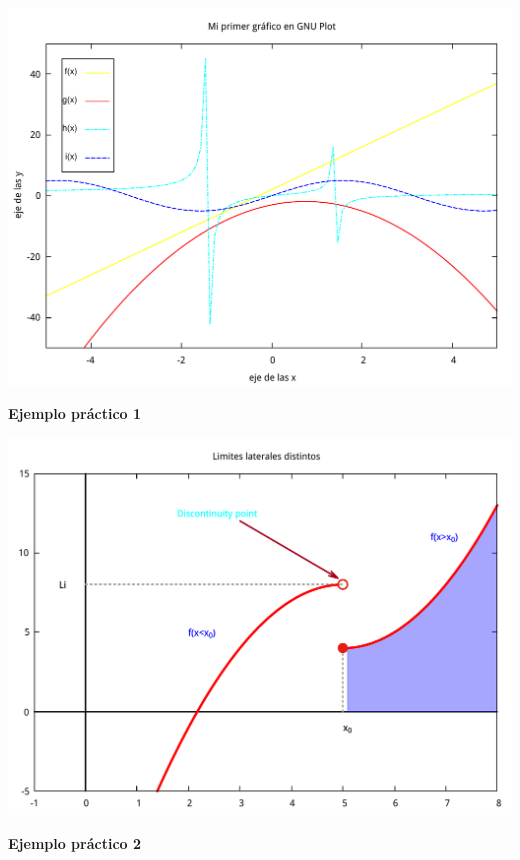 \documentclass[11.5pt,a4paper]{article}
\begin{document}
\includegraphics[scale=0.35]{ejemplo3.pdf} 

\textbf{Ejemplo práctico 1}

\includegraphics[scale=0.35]{ejemplo4.pdf} 

\textbf{Ejemplo práctico 2}
\end{document}
